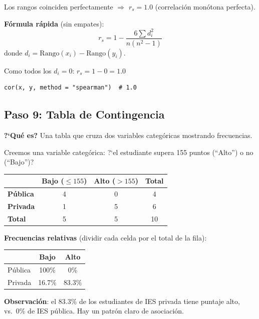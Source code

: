 \documentclass[11pt, a4paper]{article}
\begin{document}
Los rangos coinciden perfectamente $\Rightarrow$ $r_s = 1.0$ (correlaci\'on mon\'otona perfecta).

\textbf{F\'ormula r\'apida} (sin empates):
\[
r_s = 1 - \frac{6\sum d_i^2}{n(n^2 - 1)}
\]
donde $d_i = \text{Rango}(x_i) - \text{Rango}(y_i)$.

Como todos los $d_i = 0$: $r_s = 1 - 0 = \boxed{1.0}$

\begin{lstlisting}
cor(x, y, method = "spearman")  # 1.0
\end{lstlisting}

\subsection{Paso 9: Tabla de Contingencia}

\textbf{?`Qu\'e es?} Una tabla que cruza dos variables categ\'oricas mostrando frecuencias.

Creemos una variable categ\'orica: ?`el estudiante supera 155 puntos (``Alto'') o no (``Bajo'')?

\begin{center}
\begin{tabular}{lccc}
\toprule
 & \textbf{Bajo} ($\leq 155$) & \textbf{Alto} ($> 155$) & \textbf{Total} \\
\midrule
\textbf{P\'ublica}  & 4 & 0 & 4 \\
\textbf{Privada}    & 1 & 5 & 6 \\
\midrule
\textbf{Total}      & 5 & 5 & 10 \\
\bottomrule
\end{tabular}
\end{center}

\textbf{Frecuencias relativas} (dividir cada celda por el total de la fila):

\begin{center}
\begin{tabular}{lcc}
\toprule
 & \textbf{Bajo} & \textbf{Alto} \\
\midrule
P\'ublica & 100\% & 0\% \\
Privada   & 16.7\% & 83.3\% \\
\bottomrule
\end{tabular}
\end{center}

\textbf{Observaci\'on}: el 83.3\% de los estudiantes de IES privada tiene puntaje alto,
vs.\ 0\% de IES p\'ublica. Hay un patr\'on claro de asociaci\'on.
\end{document}
